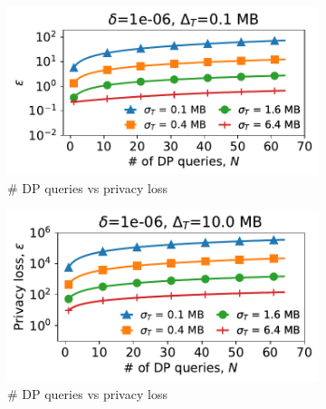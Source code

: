 \begin{figure}[t]
\begin{subfigure}{0.49\columnwidth}
    \includegraphics[width=\textwidth]{privacy_loss_VS_query_num_low_sensitivity_updated.pdf}
    \caption{\# DP queries vs privacy loss}
    \label{subfig:low-sens-epsilon-queries}
\end{subfigure}
\hfill
\begin{subfigure}{0.49\columnwidth}
    \includegraphics[width=\textwidth]{privacy_loss_VS_query_num_high_sensitivity_updated.pdf}
    \caption{\# DP queries vs privacy loss}
    \label{subfig:high-sens-epsilon-queries}
\end{subfigure}
\caption{
}
\vspace{-0.4cm}
\label{fig:privacy-microbenchmarks-extended}
\end{figure}

